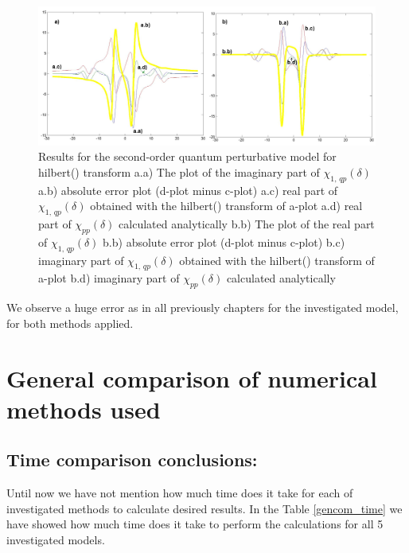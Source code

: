 \documentclass[12pt,twoside,a4paper]{article}
\numberwithin{equation}{subsection}
\numberwithin{figure}{subsection}
\begin{document}
\begin{figure}
  \includegraphics[width=150mm]{img/hilb_qp2.png}
  \caption{Results for the second-order quantum perturbative model for hilbert() transform
    a.a) The plot of the imaginary part of ${\chi_{1, \,qp}}(\delta )$
    a.b) absolute error plot (d-plot minus c-plot) 
    a.c) real part of ${\chi_{1, \,qp}}(\delta )$ obtained with the hilbert() transform of a-plot 
    a.d) real part of ${\chi_{pp}}(\delta )$ calculated analytically 
    b.b) The plot of the real part of ${\chi_{1, \,qp}}(\delta )$ 
    b.b) absolute error plot (d-plot minus c-plot) 
    b.c) imaginary part of ${\chi_{1, \,qp}}(\delta )$ obtained with the hilbert() transform of a-plot 
    b.d) imaginary part of ${\chi_{pp}}(\delta )$ calculated analytically  
    \label{fig:hilb_qp2}
  }
\end{figure}

We observe a huge error as in all previously chapters for the investigated model, for both methods applied.

\section{General comparison of numerical methods used} \label{chap:comparison}

\subsection{Time comparison conclusions:} \label{chap:gencom_time}

Until now we have not mention how much time does it take for each of investigated methods to calculate desired results. In the
Table \ref{gencom_time} we have showed how much time does it take to perform the calculations for all 5 investigated models.
\end{document}
